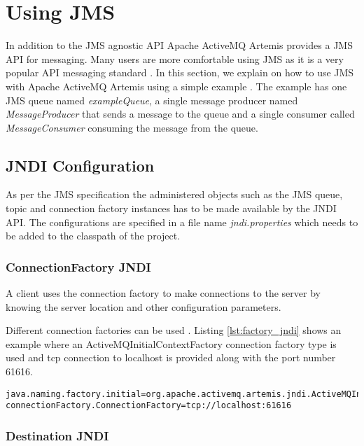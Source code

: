 \section{Using JMS}

In addition to the JMS agnostic API Apache ActiveMQ Artemis provides a JMS API for messaging. Many users are more comfortable using JMS as it is a very popular API messaging standard \parencite{Menth:2006:TPP:1140277.1140323}. In this section, we explain on how to use JMS with Apache ActiveMQ Artemis using a simple example \parencite{artemis_jms}. The example has one JMS queue named \textit{exampleQueue}, a single message producer named \textit{MessageProducer} that sends a message to the queue and a single consumer called \textit{MessageConsumer} consuming the message from the queue.

\subsection{JNDI Configuration}

As per the JMS specification the administered objects such as the JMS queue, topic and connection factory instances has to be made available by the JNDI API. The configurations are specified in a file name \textit{jndi.properties} which needs to be added to the classpath of the project.

\subsubsection{ConnectionFactory JNDI}

A client uses the connection factory to make connections to the server by knowing the server location and other configuration parameters. 

Different connection factories can be used \parencite{jms_cf}. Listing \ref{lst:factory_jndi} shows an example where an ActiveMQInitialContextFactory connection factory type is used and tcp connection to localhost is provided along with the port number 61616.

\bigskip
\begin{lstlisting}[style=BashInputStyle,caption=ConnectionFactory JNDI, label={lst:factory_jndi}]
java.naming.factory.initial=org.apache.activemq.artemis.jndi.ActiveMQInitialContextFactory
connectionFactory.ConnectionFactory=tcp://localhost:61616
\end{lstlisting}

\subsubsection{Destination JNDI}


